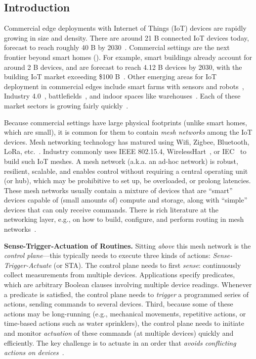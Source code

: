 \subsection{Introduction}
\label{comesh:section:intro}

Commercial edge deployments with Internet of Things (IoT) devices are rapidly growing in size and density. There are around 21 B connected IoT devices today, forecast to reach roughly 40 B by 2030~\cite{iotanalytics2025}. Commercial settings are the next frontier beyond smart homes (). For example, smart buildings already account for around 2 B devices, and are forecast to reach 4.12 B devices by 2030, with the building IoT market exceeding \$100 B~\cite{memoori2025iot}.
Other emerging areas for IoT deployment in  commercial edges include smart farms with sensors and robots~\cite{farmbeats},
Industry 4.0~\cite{lampropoulos2019internet},
battlefields~\cite{IoBT},
and indoor spaces like
warehouses~\cite{fatima2022production}.
Each of these market sectors is growing fairly   quickly~\cite{iotagrimarket}.

Because commercial settings have large physical footprints (unlike smart homes, which are small), it is common 
for them to contain {\it mesh networks} among the IoT devices. Mesh networking technology has matured
using Wifi,
Zigbee, Bluetooth, LoRa, etc.~\cite{sayian}.
Industry commonly uses  IEEE 802.15.4, WirelessHart~\cite{song2008wirelesshart}, or IEC~\cite{iso_central_secretary_systems_2016} to build such IoT meshes.  A mesh network (a.k.a. an ad-hoc network) is robust, resilient,
scalable, and enables
control without requiring a central operating unit (or hub), which may be prohibitive to set up, be overloaded, or prolong latencies. These mesh networks usually contain a mixture of devices that are ``smart'' devices capable of (small amounts of) compute and storage, along with  ``simple'' devices that can only receive commands. 
There is rich literature at the networking layer, e.g., on how to build, configure, and perform routing in mesh networks~\cite{akyildiz2005survey,lynch2024case}.


{\noindent \bf Sense-Trigger-Actuation of Routines.} Sitting {\it above} this mesh network is the  {\it control plane}---this typically needs to execute three kinds of actions:
{\it Sense-Trigger-Actuate} (or STA). The control plane needs to first {\it sense}: continuously collect measurements from multiple devices. Applications specify predicates, which are arbitrary Boolean clauses involving multiple device readings. Whenever a predicate is satisfied, the control plane  needs to {\it trigger} a programmed
series of actions, sending
commands to several devices. Third, because some of these actions may be long-running (e.g., mechanical movements, repetitive actions, or time-based actions such as water sprinklers), the control plane needs to initiate and monitor {\it actuation} of these commands (at multiple devices)  quickly and efficiently. The key challenge is to actuate in an order that {\it avoids conflicting actions on devices~\cite{Transactuations, Safehome}}.

